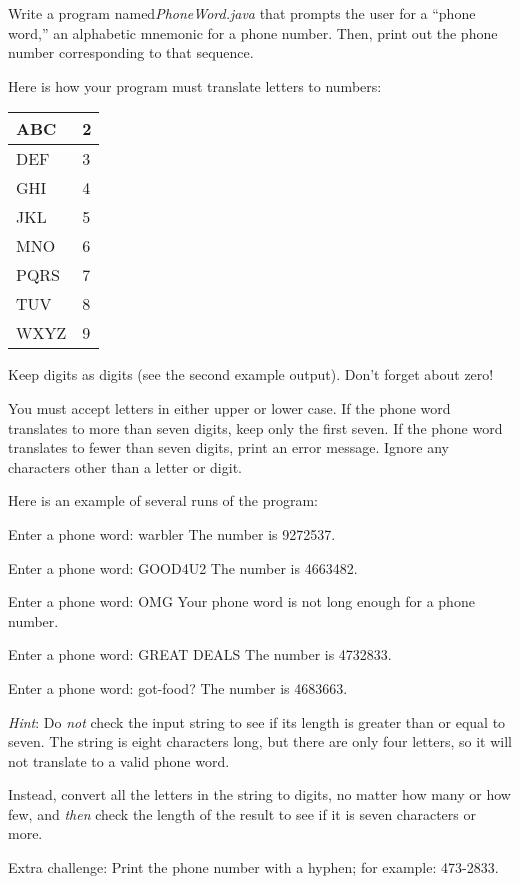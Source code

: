 \begin{exercise}
Write a program named{\it PhoneWord.java} that prompts the user for a ``phone word,'' an alphabetic mnemonic for a phone number. Then, print out the phone number corresponding to that sequence.

Here is how your program must translate letters to numbers:

\begin{tabular}{|l|l|}
\hline
ABC & 2 \\ \hline
DEF & 3 \\ \hline
GHI & 4 \\ \hline
JKL & 5 \\ \hline
MNO & 6 \\ \hline
PQRS & 7 \\ \hline
TUV & 8  \\ \hline
WXYZ & 9  \\ \hline
\end{tabular}

Keep digits as digits (see the second example output). Don't forget about zero!

You must accept letters in either upper or lower case. If the phone word translates to more than seven digits, keep only the first seven. If the phone word translates to fewer than seven digits, print an error message. Ignore any characters other than a letter or digit.

Here is an example of several runs of the program:

\begin{stdout}
Enter a phone word: warbler
The number is 9272537.

Enter a phone word: GOOD4U2
The number is 4663482.

Enter a phone word: OMG
Your phone word is not long enough for a phone number.

Enter a phone word: GREAT DEALS
The number is 4732833.

Enter a phone word: got-food?
The number is 4683663.

\end{stdout}

{\em Hint}: Do {\em not} check the input string to see if its length is greater than or equal to seven. The string 
 is eight characters long, but there are only four letters, so it will not translate to a valid phone word.

Instead, convert all the letters in the string to digits, no matter how many or how few, and {\em then} check the length of the result to see if it is seven characters or more.

Extra challenge: Print the phone number with a hyphen; for example: 473-2833.

\end{exercise}

